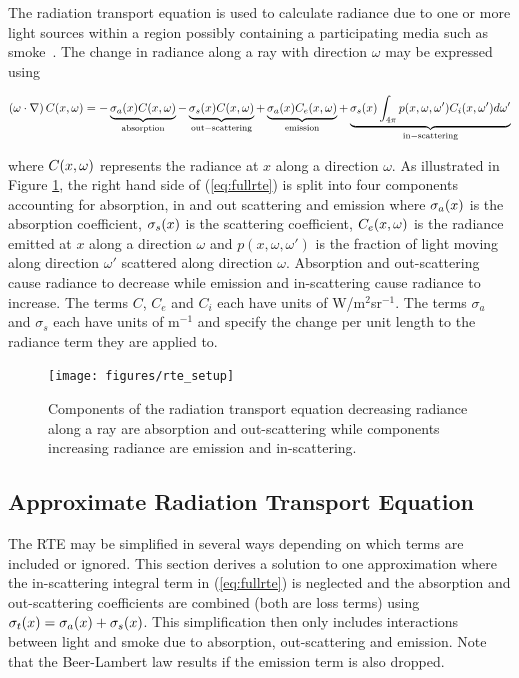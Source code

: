 The radiation transport equation is used to calculate radiance due to one or more light sources within a region possibly containing a participating media such as smoke~\cite{Siegel:2001}. The change in radiance along a ray with direction $\omega$ may be expressed using

\begin{eqnarray}
\label{eq:fullrte}
 \left(\omega\cdot\nabla\right)C(x,\omega) =
-\underbrace{\sigma_a(x)C(x,\omega)}_\mathrm{absorption}-\underbrace{\sigma_s(x)C(x,\omega)}_\mathrm{out-scattering}
+ \underbrace{\sigma_a(x)C_e(x,\omega)}_\mathrm{emission} +
\underbrace{\sigma_s(x)\int_{4\pi}p(x,\omega,\omega')C_i(x,\omega')d\omega'}_\mathrm{in-scattering}
\end{eqnarray}

\noindent where  $C(x,\omega)$ represents the  radiance at $x$ along a direction $\omega$.
As illustrated in Figure \ref{figRadiance}, the right hand side of (\ref{eq:fullrte}) is split into four components accounting for absorption, in and out scattering and emission where $\sigma_a(x)$ is the absorption coefficient, $\sigma_s(x)$ is the scattering coefficient, $C_e(x,\omega)$ is the radiance emitted at $x$ along a direction $\omega$ and $p(x,\omega,\omega')$ is the fraction of light moving along direction $\omega'$ scattered along direction $\omega$. Absorption and out-scattering cause radiance to decrease while emission and in-scattering cause radiance to increase. The terms $C$, $C_e$ and $C_i$ each have units of W/m$^2$sr$^{-1}$.  The terms $\sigma_a$ and $\sigma_s$ each have units of m$^{-1}$ and specify the change per unit length to the radiance term they are applied to.

\begin{figure}[\figoptions]
\begin{center}
\texttt{[image: figures/rte\_setup]}
\end{center}
\caption{Components of the radiation transport equation decreasing radiance along a ray are
absorption and out-scattering while components increasing radiance are emission and in-scattering.}
\label{figRadiance}
\end{figure}

%
%

\subsection{Approximate Radiation Transport Equation}

The RTE may be simplified in several ways depending on which terms are included or ignored.  This section derives a solution to one approximation where the in-scattering integral term in (\ref{eq:fullrte}) is neglected and the absorption and out-scattering coefficients are combined (both are loss terms) using $\sigma_t(x)=\sigma_a(x)+\sigma_s(x)$.  This simplification then only includes interactions between light and smoke due to absorption,  out-scattering and emission.  Note that the Beer-Lambert law results if the emission term is also dropped.

